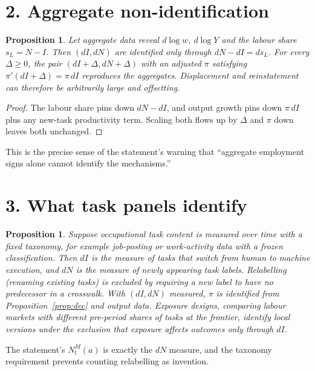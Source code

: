 \documentclass[11pt]{article}
\newtheorem{proposition}[theorem]{Proposition}
\theoremstyle{definition}
\begin{document}
\section*{2. Aggregate non-identification}
\begin{proposition}\label{prop:oe}
Let aggregate data reveal $d\log w$, $d\log Y$ and the labour share $s_L=N-I$. Then $(dI,dN)$ are identified only through
$dN-dI=ds_L$. For every $\Delta\ge0$, the pair $(dI+\Delta,dN+\Delta)$ with an adjusted $\pi$ satisfying
$\pi'(dI+\Delta)=\pi\,dI$ reproduces the aggregates. Displacement and reinstatement can therefore be arbitrarily large and
offsetting.
\end{proposition}
\begin{proof}
The labour share pins down $dN-dI$, and output growth pins down $\pi\,dI$ plus any new-task productivity term. Scaling both
flows up by $\Delta$ and $\pi$ down leaves both unchanged.
\end{proof}
This is the precise sense of the statement's warning that ``aggregate employment signs alone cannot identify the mechanisms.''

\section*{3. What task panels identify}
\begin{proposition}\label{prop:task}
Suppose occupational task content is measured over time with a fixed taxonomy, for example job-posting or work-activity
data with a frozen classification. Then $dI$ is the measure of tasks that switch from human to machine execution, and $dN$
is the measure of newly appearing task labels. Relabelling (renaming existing tasks) is excluded by requiring a new label to
have no predecessor in a crosswalk. With $(dI,dN)$ measured, $\pi$ is identified from Proposition~\ref{prop:dec} and output
data. Exposure designs, comparing labour markets with different pre-period shares of tasks at the frontier, identify local
versions under the exclusion that exposure affects outcomes only through $dI$.
\end{proposition}
The statement's $N_t^M(a)$ is exactly the $dN$ measure, and the taxonomy requirement prevents counting relabelling as
invention.
\end{document}
